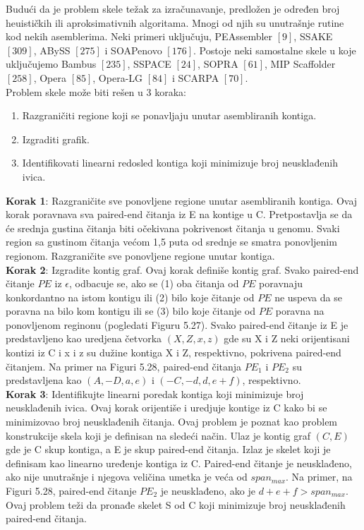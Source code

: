 \documentclass{article}
\begin{document}
Budući da je problem skele težak za izračunavanje, predložen je određen broj heuističkih ili aproksimativnih algoritama. Mnogi od njih su unutrašnje rutine kod nekih asemblerima. Neki primeri uključuju, PEAssembler $[9]$, SSAKE $[309]$, ABySS $[275]$ i SOAPenovo $[176]$. Postoje neki samostalne skele u koje uključujemo Bambus $[235]$, SSPACE $[24]$, SOPRA $[61]$, MIP Scaffolder $[258]$, Opera $[85]$, Opera-LG $[84]$ i SCARPA $[70]$. \\

Problem skele može biti rešen u 3 koraka:
\begin{enumerate}
    \item {Razgraničiti regione koji se ponavljaju unutar asembliranih kontiga.}
    \item {Izgraditi grafik.}
    \item {Identifikovati linearni redosled kontiga koji minimizuje broj neusklađenih ivica.}
\end{enumerate}

\textbf{Korak 1}: Razgraničite sve ponovljene regione unutar asembliranih kontiga. Ovaj korak poravnava sva paired-end čitanja iz E na kontige u C. Pretpostavlja se da će srednja gustina čitanja biti očekivana pokrivenost čitanja u genomu. Svaki region sa gustinom čitanja većom 1,5 puta od srednje se smatra ponovljenim regionom. Razgraničite sve ponovljene regione unutar kontiga.\\

\textbf{Korak 2}: Izgradite kontig graf. Ovaj korak definiše kontig graf. Svako paired-end čitanje $PE$ iz $\epsilon$, odbacuje se, ako se (1) oba čitanja od $PE$ poravnaju konkordantno na istom kontigu ili (2) bilo koje čitanje od $PE$ ne uspeva da se poravna na bilo kom kontigu ili se (3) bilo koje čitanje od $PE$ poravna na ponovljenom reginonu (pogledati Figuru 5.27). Svako paired-end čitanje iz E je predstavljeno kao uredjena četvorka $(X, Z, x, z)$ gde su X i Z neki orijentisani kontizi iz C i x i z su dužine kontiga X i Z, respektivno, pokrivena paired-end čitanjem. Na primer na Figuri 5.28, paired-end čitanja $PE_1$ i $PE_2$ su predstavljena kao $(A, -D, a, e)$ i $(-C, -d, d, e + f)$, respektivno.\\

\textbf{Korak 3}: Identifikujte linearni poredak kontiga koji minimizuje broj neusklađenih ivica. Ovaj korak orijentiše  i uredjuje kontige iz C kako bi se minimizovao broj neusklađenih čitanja. Ovaj problem je poznat kao problem konstrukcije skela koji je definisan na sledeći način. Ulaz je kontig graf $(C, E)$ gde je C skup kontiga, a E je skup paired-end čitanja.  Izlaz je skelet koji je definisam kao linearno uređenje kontiga iz C. Paired-end čitanje je neusklađeno, ako nije unutrašnje i njegova veličina umetka je veća od $span_{max}$. Na primer, na Figuri 5.28, paired-end čitanje $PE_2$ je neusklađeno, ako je $d + e + f > span_{max}$. Ovaj problem teži da pronađe skelet S od C koji minimizuje broj neusklađenih paired-end čitanja. \\
\end{document}
